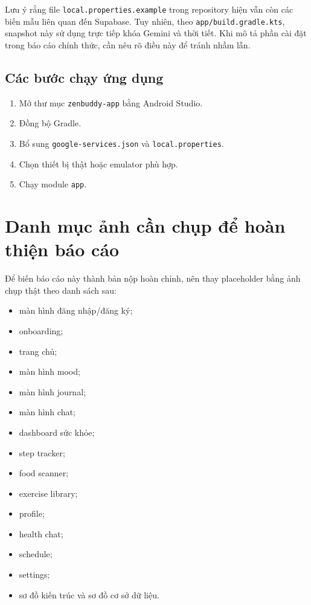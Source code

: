 \documentclass{zenbuddy-report}
\begin{document}
\begin{reportnote}
Lưu ý rằng file \texttt{local.properties.example} trong repository hiện vẫn còn các biến mẫu liên quan đến Supabase. Tuy nhiên, theo \texttt{app/build.gradle.kts}, snapshot này sử dụng trực tiếp khóa Gemini và thời tiết. Khi mô tả phần cài đặt trong báo cáo chính thức, cần nêu rõ điều này để tránh nhầm lẫn.
\end{reportnote}

\section{Các bước chạy ứng dụng}
\begin{enumerate}
  \item Mở thư mục \texttt{zenbuddy-app} bằng Android Studio.
  \item Đồng bộ Gradle.
  \item Bổ sung \texttt{google-services.json} và \texttt{local.properties}.
  \item Chọn thiết bị thật hoặc emulator phù hợp.
  \item Chạy module \texttt{app}.
\end{enumerate}

\chapter{Danh mục ảnh cần chụp để hoàn thiện báo cáo}
Để biến báo cáo này thành bản nộp hoàn chỉnh, nên thay placeholder bằng ảnh chụp thật theo danh sách sau:
\begin{itemize}
  \item màn hình đăng nhập/đăng ký;
  \item onboarding;
  \item trang chủ;
  \item màn hình mood;
  \item màn hình journal;
  \item màn hình chat;
  \item dashboard sức khỏe;
  \item step tracker;
  \item food scanner;
  \item exercise library;
  \item profile;
  \item health chat;
  \item schedule;
  \item settings;
  \item sơ đồ kiến trúc và sơ đồ cơ sở dữ liệu.
\end{itemize}

\printbibliography[title={Tài liệu tham khảo}]
\end{document}
